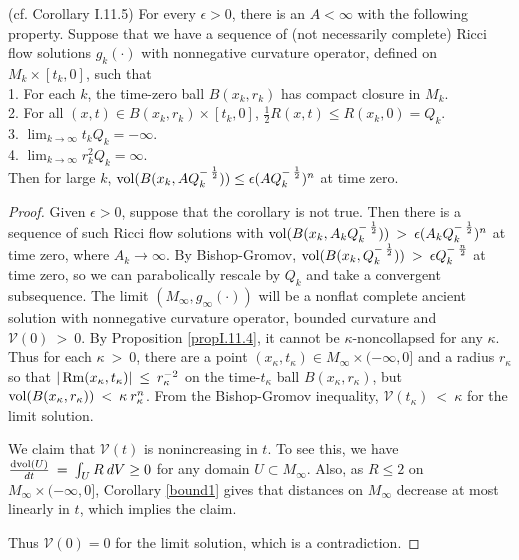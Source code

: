 \begin{corollary}
  \label{cor:kl-volume-bound-existence-curvature-operators}
 (cf. Corollary I.11.5) \label{corI.11.5}
For every $\epsilon > 0$, there is an $A < \infty$ with the following
property.  Suppose that we have a sequence of (not necessarily
complete) Ricci flow solutions $g_k(\cdot)$ with nonnegative
curvature operator, defined on $M_k \times [t_k, 0]$, such that \\
1.  For each $k$, the time-zero ball $B(x_k, r_k)$ has compact closure
in $M_k$. \\
2. For all $(x, t) \in B(x_k, r_k) \times
[t_k, 0]$, $\frac12 R(x,t) \le R(x_k, 0) = Q_k$. \\
3. $\lim_{k \rightarrow \infty} t_k Q_k = - \infty$. \\
4. $\lim_{k \rightarrow \infty} r_k^2 Q_k = \infty$. \\
Then for large $k$, $\operatorname{vol}(B(x_k, A Q_k^{- \: \frac12})) \le
\epsilon (A Q_k^{- \: \frac12})^n$ at time zero.
\end{corollary}
\begin{proof}
Given $\epsilon > 0$, suppose that the corollary is not true.
Then there is a sequence of such Ricci flow solutions with
$\operatorname{vol}(B(x_k, A_k Q_k^{- \: \frac12})) \: > \: \epsilon
(A_k Q_k^{- \: \frac12})^n$ at time zero, where
 $A_k \rightarrow \infty$.
 By Bishop-Gromov, $\operatorname{vol}(B(x_k, Q_k^{- \: \frac12})) \: > \: \epsilon
Q_k^{- \: \frac{n}{2}}$ at time zero, so we can parabolically rescale by
$Q_k$ and take a convergent subsequence. The limit $(M_\infty,
g_\infty(\cdot))$ will be a nonflat complete ancient solution with
nonnegative curvature operator, bounded curvature and
 ${\mathcal V}(0) \: > \: 0$.
 By Proposition \ref{propI.11.4}, it cannot be $\kappa$-noncollapsed
 for any $\kappa$.
Thus for each $\kappa \: > \: 0$,
there are a point $(x_\kappa, t_\kappa) \in M_\infty \times (-\infty,0]$ and a radius
$r_\kappa$ so that $|\operatorname{Rm}(x_\kappa, t_\kappa)| \: \le \:
r_\kappa^{-2}$ on the time-$t_\kappa$ ball $B(x_\kappa, r_\kappa)$,
but $\operatorname{vol}(B(x_\kappa, r_\kappa)) \: < \: \kappa \:
r_\kappa^n$. From the Bishop-Gromov inequality,
${\mathcal V}(t_\kappa) \: < \: \kappa$ for the limit solution.

We claim that
${\mathcal V}(t)$ is nonincreasing in $t$. To see this, we have
$\frac{\operatorname{dvol}(U)}{dt} \: = \: \int_U R \: dV  \ge 0$ for any domain $U
\subset M_\infty$.
Also, as $R \le 2$ on $M_\infty \times (-\infty, 0]$,
Corollary \ref{bound1}
gives that distances on $M_\infty$
decrease at most linearly in $t$,
which implies the claim.

Thus ${\mathcal V}(0) = 0$ for the limit solution, which is a contradiction.
\end{proof}

